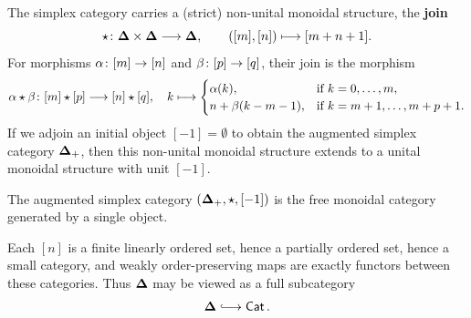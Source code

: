 \begin{definition}\label{ch2:: def: join}
    The simplex category carries a (strict) non-unital monoidal structure, the \textbf{join}
    \begin{equation}
        \star \colon \mathbf\Delta \times \mathbf\Delta \longrightarrow \mathbf\Delta, 
        \qquad ([m],[n]) \longmapsto [m+n+1].
    \end{equation}
    For morphisms $\alpha \colon [m] \rightarrow [n]$ and $\beta \colon [p] \rightarrow [q]$, their join is the morphism
    \begin{equation}
        \alpha \star \beta \colon [m]\star [p] \longrightarrow [n] \star [q], \quad
        k \longmapsto
        \begin{cases}
            \alpha(k), & \text{if } k = 0,\ldots, m, \\
            n + \beta(k-m-1), & \text{if } k = m + 1, \ldots, m + p + 1.
        \end{cases}
    \end{equation}
    If we adjoin an initial object $[-1] = \emptyset$ to obtain the augmented simplex category $\mathbf\Delta_{+}$, then this non-unital monoidal structure extends to a unital monoidal structure with unit $[-1]$.
\end{definition}


\begin{proposition}\cite[Section~5, Proposition~1]{Mac}
    The augmented simplex category $(\mathbf\Delta_{+},\star,[-1])$ is the free monoidal category generated by a single object.
\end{proposition}


\begin{observation}
    Each $[n]$ is a finite linearly ordered set, hence a partially ordered set, hence a small category, and weakly order-preserving maps are exactly functors between these categories. Thus $\mathbf\Delta$ may be viewed as a full subcategory
    \begin{equation}
        \bDelta \longhookra \Cat.
    \end{equation}
\end{observation}

